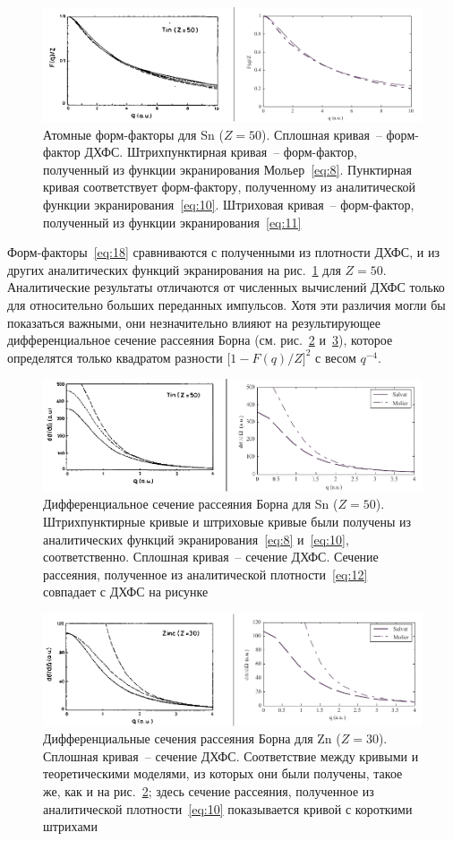 \documentclass[10pt,pscyr]{hedlab}
\newcommand{\eq}  [1]{\eqref{eq:#1}}
\newcommand{\pic} [1]{\ref{pic:#1}}
\begin{document}
  \begin{figure}[htb!]
    \center
    \includegraphics[width=.7\textwidth]{pic_3}
    \caption{Атомные форм-факторы для Sn (\( Z = 50 \)). Сплошная кривая~--
      форм-фактор ДХФС. Штрихпунктирная кривая~-- форм-фактор, полученный из
      функции экранирования Мольер~\eq{8}. Пунктирная кривая соответствует
      форм-фактору, полученному из аналитической функции экранирования~\eq{10}.
      Штриховая кривая~-- форм-фактор, полученный из функции
      экранирования~\eq{11}}
    \label{pic:3}
  \end{figure}
  
  Форм-факторы~\eq{18} сравниваются с полученными из плотности ДХФС, и из
  других аналитических функций экранирования на рис.~\pic{3} для \( Z = 50 \).
  Аналитические результаты отличаются от численных вычислений ДХФС только для
  относительно больших переданных импульсов. Хотя эти различия могли бы
  показаться важными, они незначительно влияют на результирующее
  дифференциальное сечение рассеяния Борна (см. рис.~\pic{4} и~\pic{5}),
  которое определятся только квадратом разности
  \( \bigl[1 - F(q) / Z\big]^2 \) с весом \( q^{-4} \).
  
  \begin{figure}[htb!]
    \center
    \includegraphics[width=.7\textwidth]{pic_4}
    \caption{Дифференциальное сечение рассеяния Борна для Sn (\( Z = 50 \)).
      Штрихпунктирные кривые и штриховые кривые были получены из аналитических
      функций экранирования~\eq{8} и~\eq{10}, соответственно. Сплошная кривая~--
      сечение ДХФС. Сечение рассеяния, полученное из аналитической
      плотности~\eq{12} совпадает с ДХФС на рисунке}
    \label{pic:4}
  \end{figure}
  
  \begin{figure}[htb!]
    \center
    \includegraphics[width=.7\textwidth]{pic_5}
    \caption{Дифференциальные сечения рассеяния Борна для Zn (\( Z = 30 \)).
      Сплошная кривая~-- сечение ДХФС. Соответствие между кривыми и
      теоретическими моделями, из которых они были получены, такое же, как и
      на рис.~\pic{4}; здесь сечение рассеяния, полученное из аналитической
      плотности~\eq{10} показывается кривой с короткими штрихами}
    \label{pic:5}
  \end{figure}
  
\end{document}
